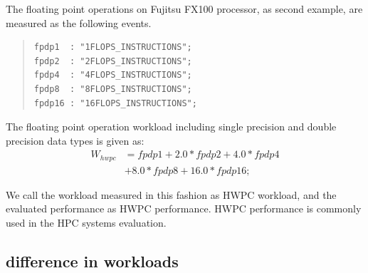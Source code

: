 \documentclass[conference]{IEEEtran}
\begin{document}
The floating point operations on Fujitsu FX100 processor, as second example,
are measured as the following events.
\begin{quote}
\begin{small}
\begin{verbatim}
fpdp1  : "1FLOPS_INSTRUCTIONS";
fpdp2  : "2FLOPS_INSTRUCTIONS";
fpdp4  : "4FLOPS_INSTRUCTIONS";
fpdp8  : "8FLOPS_INSTRUCTIONS";
fpdp16 : "16FLOPS_INSTRUCTIONS";
\end{verbatim}
\end{small}
\end{quote}
The floating point operation workload including single precision
and double precision data types is given as:
\begin{align}
	W_{hwpc} & = fpdp1 + 2.0*fpdp2 + 4.0*fpdp4 \nonumber \\
			& + 8.0*fpdp8 + 16.0*fpdp16; 
\end{align}

We call the workload measured in this fashion as HWPC workload,
and the evaluated performance as HWPC performance.
HWPC performance is commonly used in the HPC systems evaluation.


\subsection{difference in workloads}
\label{subsection:difference-in-workloads}
\end{document}
